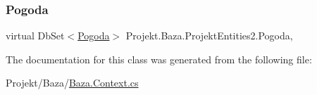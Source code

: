 \subsubsection{\texorpdfstring{Pogoda}{Pogoda}}
{\footnotesize\ttfamily virtual Db\+Set$<$\mbox{\hyperlink{class_projekt_1_1_baza_1_1_pogoda}{Pogoda}}$>$ Projekt.\+Baza.\+Projekt\+Entities2.\+Pogoda\hspace{0.3cm}{\ttfamily [get]}, {\ttfamily [set]}}



The documentation for this class was generated from the following file\+:\begin{DoxyCompactItemize}
\item 
Projekt/\+Baza/\mbox{\hyperlink{_baza_8_context_8cs}{Baza.\+Context.\+cs}}\end{DoxyCompactItemize}
